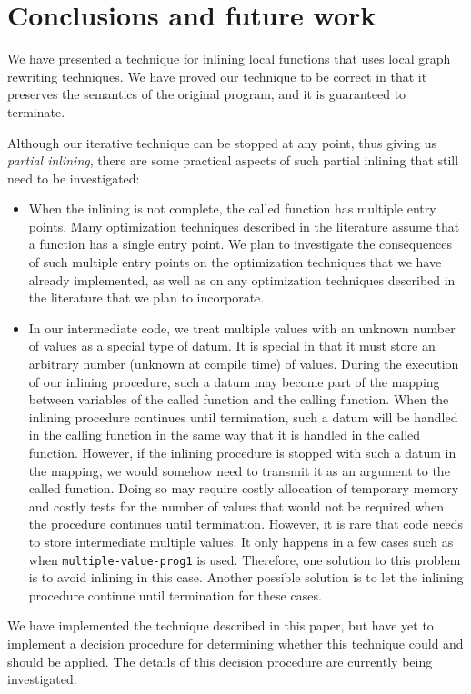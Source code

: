\section{Conclusions and future work}
\label{sec-conclusions}

We have presented a technique for inlining local functions that uses
local graph rewriting techniques.  We have proved our technique to be
correct in that it preserves the semantics of the original program,
and it is guaranteed to terminate.

Although our iterative technique can be stopped at any point, thus
giving us \emph{partial inlining}, there are some practical aspects of
such partial inlining that still need to be investigated:

\begin{itemize}
\item When the inlining is not complete, the called function has
  multiple entry points.  Many optimization techniques described in
  the literature assume that a function has a single entry point.  We
  plan to investigate the consequences of such multiple entry points
  on the optimization techniques that we have already implemented, as
  well as on any optimization techniques described in the literature
  that we plan to incorporate.
\item In our intermediate code, we treat multiple values with an
  unknown number of values as a special type of datum.  It is special
  in that it must store an arbitrary number (unknown at compile time)
  of values.  During the execution of our inlining procedure, such a
  datum may become part of the mapping between variables of the called
  function and the calling function.  When the inlining procedure
  continues until termination, such a datum will be handled in the
  calling function in the same way that it is handled in the called
  function.  However, if the inlining procedure is stopped with such a
  datum in the mapping, we would somehow need to transmit it as an
  argument to the called function.  Doing so may require costly
  allocation of temporary memory and costly tests for the number of
  values that would not be required when the procedure continues until
  termination.  However, it is rare that code needs to store
  intermediate multiple values.  It only happens in a few cases such
  as when \texttt{multiple-value-prog1} is used.  Therefore, one
  solution to this problem is to avoid inlining in this case.  Another
  possible solution is to let the inlining procedure continue until
  termination for these cases.
\end{itemize}

We have implemented the technique described in this paper, but have
yet to implement a decision procedure for determining whether this
technique could and should be applied.  The details of this decision
procedure are currently being investigated.
